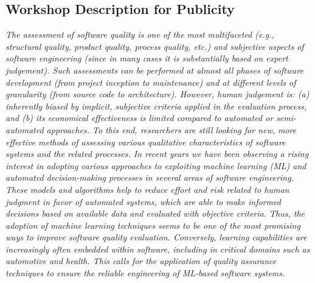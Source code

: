 \subsection{Workshop Description for Publicity}
 \textit{The assessment of software quality is one of the most multifaceted (e.g., structural quality, product quality, process quality, etc.) and subjective aspects of software engineering (since in many cases it is substantially based on expert judgement).
    Such assessments can be performed at almost all phases of software development (from project inception to maintenance) and at different levels of granularity (from source code to architecture). However, human judgement is: (a) inherently biased by implicit, subjective criteria applied in the evaluation process, and (b) its economical effectiveness is limited compared to automated or semi-automated approaches.
    To this end, researchers are still looking for new, more effective methods of assessing various qualitative characteristics of software systems and the related processes.
    In recent years we have been observing a rising interest in adopting various approaches to exploiting machine learning (ML) and automated decision-making processes in several areas of software engineering. These models and algorithms help to reduce effort and risk related to human judgment in favor of automated systems, which are able to make informed decisions based on available data and evaluated with objective criteria.
    Thus, the adoption of machine learning techniques seems to be one of the most promising ways to improve software quality evaluation.
    Conversely, learning capabilities are increasingly often embedded within software, including in critical domains such as automotive and health.
    This calls for the application of quality assurance techniques to ensure the reliable engineering of ML-based software systems.}